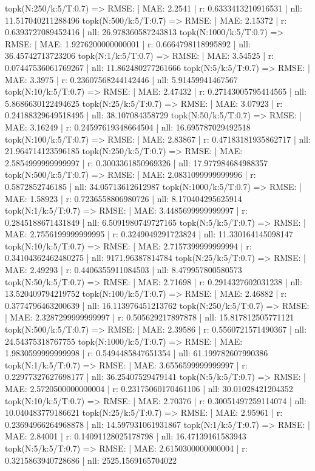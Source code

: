 topk(N:250/k:5/T:0.7) => RMSE: | MAE: 2.2541 | r: 0.6333413210916531 | nll: 11.517040211288496
topk(N:500/k:5/T:0.7) => RMSE: | MAE: 2.15372 | r: 0.6393727089452416 | nll: 26.978360587243813
topk(N:1000/k:5/T:0.7) => RMSE: | MAE: 1.9276200000000001 | r: 0.6664798118995892 | nll: 36.45742713723206
topk(N:1/k:5/T:0.7) => RMSE: | MAE: 3.54525 | r: 0.07447536061769267 | nll: 11.862480277261666
topk(N:5/k:5/T:0.7) => RMSE: | MAE: 3.3975 | r: 0.23607568244142446 | nll: 5.91459941467567
topk(N:10/k:5/T:0.7) => RMSE: | MAE: 2.47432 | r: 0.27143005795414565 | nll: 5.8686630122494625
topk(N:25/k:5/T:0.7) => RMSE: | MAE: 3.07923 | r: 0.24188329649518495 | nll: 38.107084358729
topk(N:50/k:5/T:0.7) => RMSE: | MAE: 3.16249 | r: 0.24597619348664504 | nll: 16.695787029492518
topk(N:100/k:5/T:0.7) => RMSE: | MAE: 2.83867 | r: 0.47183181935862717 | nll: 21.964714123596185
topk(N:250/k:5/T:0.7) => RMSE: | MAE: 2.5854999999999997 | r: 0.3003361850969326 | nll: 17.977984684988357
topk(N:500/k:5/T:0.7) => RMSE: | MAE: 2.0831099999999996 | r: 0.5872852746185 | nll: 34.05713612612987
topk(N:1000/k:5/T:0.7) => RMSE: | MAE: 1.58923 | r: 0.7236558806980726 | nll: 8.170404295625914
topk(N:1/k:5/T:0.7) => RMSE: | MAE: 3.4485699999999997 | r: 0.2845188671431849 | nll: 6.5091980749727165
topk(N:5/k:5/T:0.7) => RMSE: | MAE: 2.7556199999999995 | r: 0.3249049291723824 | nll: 11.330164145098147
topk(N:10/k:5/T:0.7) => RMSE: | MAE: 2.7157399999999994 | r: 0.34104362462480275 | nll: 9171.96387814784
topk(N:25/k:5/T:0.7) => RMSE: | MAE: 2.49293 | r: 0.4406355911084503 | nll: 8.479957800580573
topk(N:50/k:5/T:0.7) => RMSE: | MAE: 2.71698 | r: 0.2914327602031238 | nll: 13.520409794219752
topk(N:100/k:5/T:0.7) => RMSE: | MAE: 2.46882 | r: 0.3774796463200639 | nll: 16.113976451213762
topk(N:250/k:5/T:0.7) => RMSE: | MAE: 2.3287299999999997 | r: 0.505629217897878 | nll: 15.817812505771121
topk(N:500/k:5/T:0.7) => RMSE: | MAE: 2.39586 | r: 0.5560721571490367 | nll: 24.54375318767755
topk(N:1000/k:5/T:0.7) => RMSE: | MAE: 1.9830599999999998 | r: 0.5494485847651354 | nll: 61.199782607990386
topk(N:1/k:5/T:0.7) => RMSE: | MAE: 3.6556599999999997 | r: 0.22977327627698177 | nll: 36.25407529479141
topk(N:5/k:5/T:0.7) => RMSE: | MAE: 2.5720500000000004 | r: 0.23175060170461106 | nll: 30.01028421204352
topk(N:10/k:5/T:0.7) => RMSE: | MAE: 2.70376 | r: 0.30051497259114074 | nll: 10.040483779186621
topk(N:25/k:5/T:0.7) => RMSE: | MAE: 2.95961 | r: 0.23694966264968878 | nll: 14.597931061931867
topk(N:1/k:5/T:0.7) => RMSE: | MAE: 2.84001 | r: 0.14091128025178798 | nll: 16.47139161583943
topk(N:5/k:5/T:0.7) => RMSE: | MAE: 2.6150300000000004 | r: 0.3215863940728686 | nll: 2525.1569165704022
